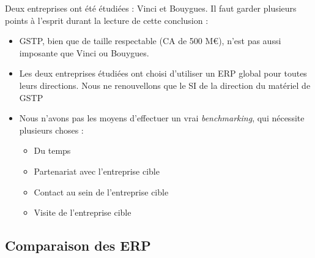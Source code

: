 \documentclass[twoside]{article}
\begin{document}
Deux entreprises ont été étudiées : Vinci et Bouygues. Il faut garder
plusieurs points à l'esprit durant la lecture de cette conclusion :

\begin{itemize}
\item GSTP, bien que de taille respectable (CA de 500 M\euro), n'est pas aussi
imposante que Vinci ou Bouygues.
\item Les deux entreprises étudiées ont choisi d'utiliser un ERP
global pour toutes leurs directions. Nous ne renouvellons que le SI de la
direction du matériel de GSTP
\item Nous n'avons pas les moyens d'effectuer un vrai {\sl benchmarking}, qui
nécessite plusieurs choses :
    \begin{itemize}
    \item Du temps
    \item Partenariat avec l'entreprise cible
    \item Contact au sein de l'entreprise cible
    \item Visite de l'entreprise cible
    \end{itemize}
\end{itemize}

\vfill


\pagebreak
\subsection{Comparaison des ERP}
\end{document}
